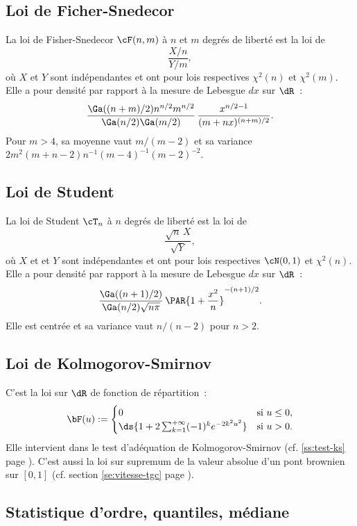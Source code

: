 %
\subsection{Loi de Ficher-Snedecor}\label{ss:loi:fisher-snedecor}
%

La loi de Fisher-Snedecor $\cF(n,m)$ à $n$ et $m$ degrés de liberté est la loi
de
$$
\frac{X/n}{Y/m},
$$
où $X$ et $Y$ sont indépendantes et ont pour lois respectives $\chi^2(n)$
et $\chi^2(m)$. Elle a pour densité par rapport à la mesure de Lebesgue $dx$
sur $\dR$~:
$$
\frac{\Ga((n+m)/2) n^{n/2}
  m^{n/2}}{\Ga(n/2)\Ga(m/2)}\,\frac{x^{n/2-1}}{(m+nx)^{(n+m)/2}}.
$$
Pour $m>4$, sa moyenne vaut $m/(m-2)$ et sa variance
$2m^2(m+n-2)n^{-1}(m-4)^{-1}(m-2)^{-2}$.

%
\subsection{Loi de Student}\label{ss:loi:student}
%

La loi de Student $\cT_n$ à $n$ degrés de liberté est la loi de
$$
\frac{\sqrt{n}\,X}{\sqrt{Y}},
$$
où $X$ et et $Y$ sont indépendantes et ont pour lois respectives $\cN(0,1)$
et $\chi^2(n)$. Elle a pour densité par rapport à la mesure de Lebesgue $dx$ sur
$\dR$~:
$$
\frac{\Ga((n+1)/2)}{\Ga(n/2)\sqrt{n\pi}}\,\PAR{1+\frac{x^2}{n}}^{-(n+1)/2}.
$$
Elle est centrée et sa variance vaut $n/(n-2)$ pour $n>2$.

%
\subsection{Loi de Kolmogorov-Smirnov}\label{ss:loi:kolmogorov-smirnov}
%

C'est la loi sur $\dR$ de fonction de répartition~:
$$
\bF(u):=
\begin{cases}
  0 & \text{si } u\leq0,\\
  \ds{1+2 \sum_{k=1}^{+\infty} (-1)^k e^{-2k^2u^2}} & \text{si } u>0.
\end{cases}
$$
Elle intervient dans le test d'adéquation de Kolmogorov-Smirnov (cf.
\ref{ss:test-ks} page \pageref{ss:test-ks}). C'est aussi la loi sur supremum
de la valeur absolue d'un pont brownien sur $[0,1]$ (cf. section
\ref{se:vitesse-tgc} page \pageref{se:vitesse-tgc}).

%
\subsection{Statistique d'ordre, quantiles, médiane}\label{ss:loi:statordre}
%

